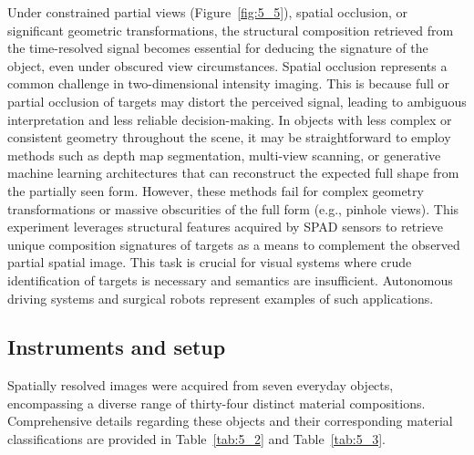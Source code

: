 \documentclass[12pt,a4paper,oneside]{report}
\begin{document}
Under constrained partial views (Figure~\ref{fig:5_5}), spatial occlusion, or significant geometric transformations, the structural composition retrieved from the time-resolved signal becomes essential for deducing the signature of the object, even under obscured view circumstances. Spatial occlusion represents a common challenge in two-dimensional intensity imaging. This is because full or partial occlusion of targets may distort the perceived signal, leading to ambiguous interpretation and less reliable decision-making. In objects with less complex or consistent geometry throughout the scene, it may be straightforward to employ methods such as depth map segmentation, multi-view scanning, or generative machine learning architectures that can reconstruct the expected full shape from the partially seen form. However, these methods fail for complex geometry transformations or massive obscurities of the full form (e.g., pinhole views). This experiment leverages structural features acquired by SPAD sensors to retrieve unique composition signatures of targets as a means to complement the observed partial spatial image. This task is crucial for visual systems where crude identification of targets is necessary and semantics are insufficient. Autonomous driving systems and surgical robots represent examples of such applications.


\subsection{Instruments and setup}
\label{subsec:instruments_setup_chapter5}

Spatially resolved images were acquired from seven everyday objects, encompassing a diverse range of thirty-four distinct material compositions. Comprehensive details regarding these objects and their corresponding material classifications are provided in Table~\ref{tab:5_2} and Table~\ref{tab:5_3}.
\end{document}
